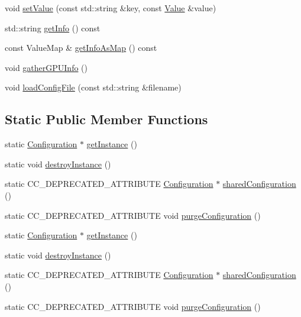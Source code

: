 \begin{DoxyCompactItemize}
\item 
void \hyperlink{classConfiguration_a33af625654620b5fe9fe0f644278424c}{set\+Value} (const std\+::string \&key, const \hyperlink{classValue}{Value} \&value)
\item 
std\+::string \hyperlink{classConfiguration_ab87bc1959c25c1e1f1887561f52aa0f7}{get\+Info} () const
\item 
const Value\+Map \& \hyperlink{classConfiguration_a4f2eb957b2b5fffc55c87eb30ab7740c}{get\+Info\+As\+Map} () const
\item 
void \hyperlink{classConfiguration_a708084005c949e65fe4ce442081cf89e}{gather\+G\+P\+U\+Info} ()
\item 
void \hyperlink{classConfiguration_a1204d5d346ef086d437babc75677293d}{load\+Config\+File} (const std\+::string \&filename)
\end{DoxyCompactItemize}
\subsection*{Static Public Member Functions}
\begin{DoxyCompactItemize}
\item 
static \hyperlink{classConfiguration}{Configuration} $\ast$ \hyperlink{classConfiguration_ae327d26e81014cf46b25802478fe9b8e}{get\+Instance} ()
\item 
static void \hyperlink{classConfiguration_acbc9e73d16e5eb122e7daef71c955cf2}{destroy\+Instance} ()
\item 
static C\+C\+\_\+\+D\+E\+P\+R\+E\+C\+A\+T\+E\+D\+\_\+\+A\+T\+T\+R\+I\+B\+U\+TE \hyperlink{classConfiguration}{Configuration} $\ast$ \hyperlink{classConfiguration_a298e51e4fadaa9157a9f8ba2688fb00e}{shared\+Configuration} ()
\item 
static C\+C\+\_\+\+D\+E\+P\+R\+E\+C\+A\+T\+E\+D\+\_\+\+A\+T\+T\+R\+I\+B\+U\+TE void \hyperlink{classConfiguration_abf8266180bf01733dc5e4b5fb0006c78}{purge\+Configuration} ()
\item 
static \hyperlink{classConfiguration}{Configuration} $\ast$ \hyperlink{classConfiguration_a2a17128e80c832648bdf255be27eca13}{get\+Instance} ()
\item 
static void \hyperlink{classConfiguration_a223669fddc7b1c797c61907129b3674e}{destroy\+Instance} ()
\item 
static C\+C\+\_\+\+D\+E\+P\+R\+E\+C\+A\+T\+E\+D\+\_\+\+A\+T\+T\+R\+I\+B\+U\+TE \hyperlink{classConfiguration}{Configuration} $\ast$ \hyperlink{classConfiguration_a78398b93c54c0505f98efa0ae56dbb6f}{shared\+Configuration} ()
\item 
static C\+C\+\_\+\+D\+E\+P\+R\+E\+C\+A\+T\+E\+D\+\_\+\+A\+T\+T\+R\+I\+B\+U\+TE void \hyperlink{classConfiguration_a65a257355e83f9b2ad136d2de3f654ee}{purge\+Configuration} ()
\end{DoxyCompactItemize}

